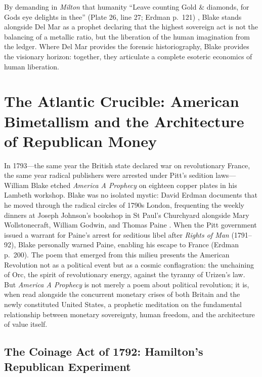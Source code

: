 \documentclass[
]{article}
\begin{document}
By demanding in \emph{Milton} that humanity ``Leave counting Gold \&
diamonds, for Gods eye delights in thee'' (Plate 26, line 27; Erdman
p.~121) \citep{erdman1988complete}, Blake stands alongside Del Mar as a
prophet declaring that the highest sovereign act is not the balancing of
a metallic ratio, but the liberation of the human imagination from the
ledger. Where Del Mar provides the forensic historiography, Blake
provides the visionary horizon: together, they articulate a complete
esoteric economics of human liberation.

\newpage

\section{The Atlantic Crucible: American Bimetallism and the
Architecture of Republican
Money}\label{the-atlantic-crucible-american-bimetallism-and-the-architecture-of-republican-money}

In 1793---the same year the British state declared war on revolutionary
France, the same year radical publishers were arrested under Pitt's
sedition laws---William Blake etched \emph{America A Prophecy} on
eighteen copper plates in his Lambeth workshop. Blake was no isolated
mystic: David Erdman documents that he moved through the radical circles
of 1790s London, frequenting the weekly dinners at Joseph Johnson's
bookshop in St Paul's Churchyard alongside Mary Wollstonecraft, William
Godwin, and Thomas Paine \citep{erdman1954prophet}. When the Pitt
government issued a warrant for Paine's arrest for seditious libel after
\emph{Rights of Man} (1791--92), Blake personally warned Paine, enabling
his escape to France (Erdman p.~200). The poem that emerged from this
milieu presents the American Revolution not as a political event but as
a cosmic conflagration: the unchaining of Orc, the spirit of
revolutionary energy, against the tyranny of Urizen's law. But
\emph{America A Prophecy} is not merely a poem about political
revolution; it is, when read alongside the concurrent monetary crises of
both Britain and the newly constituted United States, a prophetic
meditation on the fundamental relationship between monetary sovereignty,
human freedom, and the architecture of value itself.

\subsection{The Coinage Act of 1792: Hamilton's Republican
Experiment}\label{the-coinage-act-of-1792-hamiltons-republican-experiment}
\end{document}
